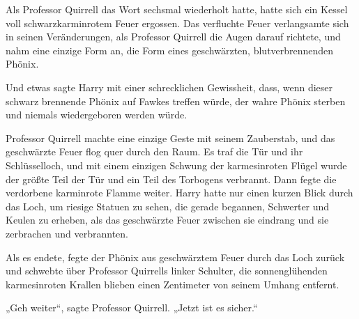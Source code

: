 Als Professor Quirrell das Wort sechsmal wiederholt hatte, hatte sich ein Kessel voll schwarzkarminrotem Feuer ergossen. Das verfluchte Feuer verlangsamte sich in seinen Veränderungen, als Professor Quirrell die Augen darauf richtete, und nahm eine einzige Form an, die Form eines geschwärzten, blutverbrennenden Phönix.

Und etwas sagte Harry mit einer schrecklichen Gewissheit, dass, wenn dieser schwarz brennende Phönix auf Fawkes treffen würde, der wahre Phönix sterben und niemals wiedergeboren werden würde.

Professor Quirrell machte eine einzige Geste mit seinem Zauberstab, und das geschwärzte Feuer flog quer durch den Raum. Es traf die Tür und ihr Schlüsselloch, und mit einem einzigen Schwung der karmesinroten Flügel wurde der größte Teil der Tür und ein Teil des Torbogens verbrannt. Dann fegte die verdorbene karminrote Flamme weiter.
Harry hatte nur einen kurzen Blick durch das Loch, um riesige Statuen zu sehen, die gerade begannen, Schwerter und Keulen zu erheben, als das geschwärzte Feuer zwischen sie eindrang und sie zerbrachen und verbrannten.

Als es endete, fegte der Phönix aus geschwärztem Feuer durch das Loch zurück und schwebte über Professor Quirrells linker Schulter, die sonnenglühenden karmesinroten Krallen blieben einen Zentimeter von seinem Umhang entfernt.

„Geh weiter“, sagte Professor Quirrell.
„Jetzt ist es sicher.“


